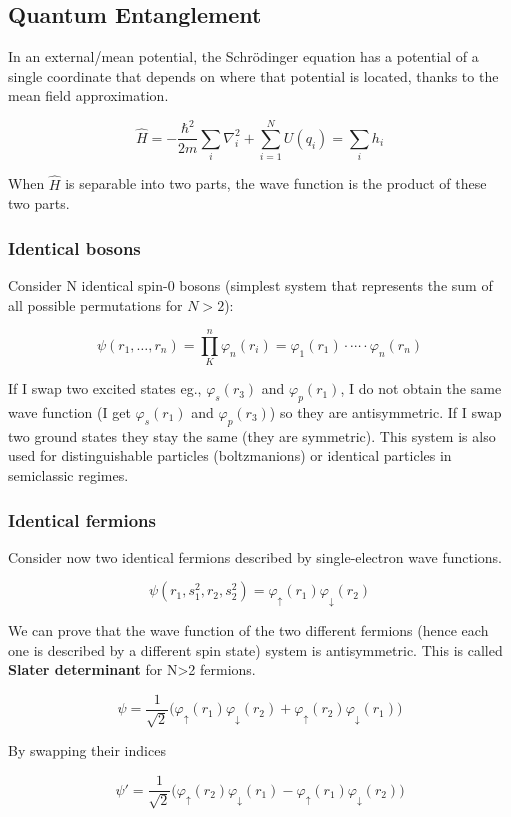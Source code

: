 	\subsection{Quantum Entanglement}
	In an external/mean potential, the Schr\"odinger equation has a potential of a single coordinate that depends on where that potential is located, thanks to the mean field approximation.

	$$\hat{H}=-\frac{\hbar^2}{2m}\sum_{i}\nabla_i^2+\sum_{i=1}^NU(q_i)=\sum_i h_i$$

	When $\hat{H}$ is separable into two parts, the wave function is the product of these two parts.


		\subsubsection{Identical bosons}
		Consider N identical spin-0 bosons (simplest system that represents the sum of all possible permutations for $N > 2$):

		$$\psi(r_1, \dots, r_n)= \prod_K^n\varphi_n(r_i)=\varphi_1(r_1)\cdot \cdots\cdot \varphi_n(r_n)$$

		If I swap two excited states eg., $\varphi_s(r_3)$ and $\varphi_p(r_1)$, I do not obtain the same wave function (I get $\varphi_s(r_1)$ and $\varphi_p(r_3)$) so they are antisymmetric.
		If I swap two ground states they stay the same (they are symmetric).
		This system is also used for distinguishable particles (boltzmanions) or identical particles in semiclassic regimes.

		\subsubsection{Identical fermions}
		Consider now two identical fermions described by single-electron wave functions.

		$$\psi(r_1, s_1^2, r_2, s_2^2)=\varphi_{\uparrow}(r_1)\varphi_{\downarrow}(r_2)$$

		We can prove that the wave function of the two different fermions (hence each one is described by a different spin state) system is antisymmetric.
		This is called \textbf{Slater determinant} for N>2 fermions.

		$$\psi=\frac{1}{\sqrt{2}}\big(\varphi_{\uparrow}(r_1)\varphi_{\downarrow}(r_2)+\varphi_{\uparrow}(r_2)\varphi_{\downarrow}(r_1)\big)$$

		By swapping their indices

		$$\psi'=\frac{1}{\sqrt{2}}\big(\varphi_{\uparrow}(r_2)\varphi_{\downarrow}(r_1)-\varphi_{\uparrow}(r_1)\varphi_{\downarrow}(r_2)\big)$$

